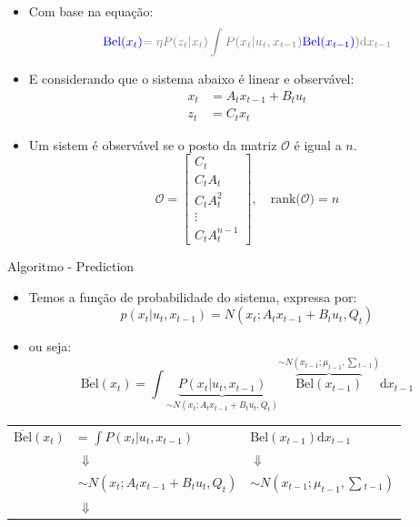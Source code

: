 \begin{itemize}
    \item Com base na equação:
    \begin{equation*}
        \color{blue}{\text{Bel}}(x_t)  \color{gray}{=\eta P(z_t|x_t)\displaystyle\int P(x_t| u_t,x_{t-1})}\color{blue}{\color{blue}{\text{Bel}}(x_{t-1})}\color{gray}{)\text{d}x_{t-1}}
    \end{equation*}
    \item E considerando que o sistema abaixo é linear e observável:
    \begin{equation*}
        \begin{split}
            x_t &= A_t x_{t-1} + B_t u_t\\ 
            z_t &= C_t x_t
        \end{split}
    \end{equation*}
    \item Um sistem é observável se o posto da matriz $\mathcal {O}$ é igual a $n$.
    \begin{equation*}
        \mathcal {O}={\begin{bmatrix}C_t\\C_tA_t\\C_tA^{2}_t\\\vdots \\C_tA^{n-1}_t\end{bmatrix}, \quad \text{rank}(\mathcal {O}}) = n
    \end{equation*}
\end{itemize}



Algoritmo - Prediction
\begin{itemize}
    \item Temos a função de probabilidade do sistema, expressa por:
    \begin{equation*}
        p(x_t| u_t, x_{t-1})= N\left(x_t; A_tx_{t-1}+ B_tu_t, Q_t\right)
    \end{equation*}   
    \item ou seja:
    \begin{equation*}
        \overline{\text{Bel}}(x_t)  = \displaystyle\int\underbrace{P(x_t|u_t, x_{t-1})}_{\sim N\left(x_t; A_t x_{t-1}+ B_tu_t, Q_t\right)} \overbrace{\text{Bel}(x_{t-1})}^{\sim N\left(x_{t-1}; \mu_{t-1}, \textstyle\sum {}_{t-1}\right)}\text{d}x_{t-1}
    \end{equation*}
\end{itemize}


\begin{tabular}{p{1.5cm} l l}
    $\overline{\text{Bel}}(x_t)$  & = $\displaystyle\int P(x_t|u_t, x_{t-1})$ & $\text{Bel}(x_{t-1})\text{d}x_{t-1}$ \\
    & \quad\quad\quad\quad\quad $\Downarrow$ & \quad\quad\quad$\Downarrow$ \\
    & $\sim N\left(x_t; A_t x_{t-1}+ B_tu_t, Q_t\right)$ & $\sim N\left(x_{t-1}; \mu_{t-1}, \textstyle\sum {}_{t-1}\right)$ \\
    & \quad\quad\quad\quad\quad $\Downarrow$ & \\
\end{tabular}


